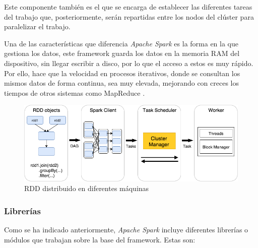 Este componente también es el que se encarga de establecer las diferentes tareas del trabajo que, posteriormente, serán repartidas entre los nodos del clúster para paralelizar el trabajo.

Una de las características que diferencia \textit{Apache Spark} es la forma en la que gestiona los datos, este \gls{framework} guarda los datos en la memoria \gls{RAM} del dispositivo, sin llegar escribir a disco, por lo que el acceso a estos es muy rápido. Por ello, hace que la velocidad en procesos iterativos, donde se consultan los mismos datos de forma continua, sea muy elevada, mejorando con creces los tiempos de otros sistemas como MapReduce \cite{compSpark}.

\begin{figure}[htp!]
	\centering
	\caption{\gls{RDD} distribuido en diferentes máquinas \cite{sparkdistributed}}
	\label{rdddistribuido}
	\vspace{5pt}
	\includegraphics[scale=0.55]{graphics/rdddistribuido}
\end{figure}

\clearpage
\subsubsection{Librerías}
Como se ha indicado anteriormente, \textit{Apache Spark} incluye diferentes librerías o módulos que trabajan sobre la base del \gls{framework}. Estas son:

